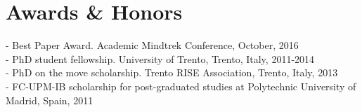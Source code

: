 
\section{Awards \& Honors}

- Best Paper Award. Academic Mindtrek Conference, October, 2016\\
- PhD student fellowship. University of Trento, Trento, Italy, 2011-2014\\
- PhD on the move scholarship. Trento RISE Association, Trento, Italy, 2013\\
- FC-UPM-IB scholarship for post-graduated studies at Polytechnic University of Madrid, Spain, 2011
